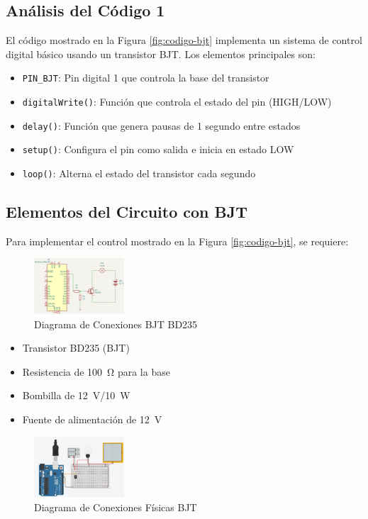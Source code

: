 \subsection{Análisis del Código 1}
El código mostrado en la Figura \ref{fig:codigo-bjt} implementa un sistema de control digital básico usando un transistor BJT. Los elementos principales son:

\begin{itemize}
	\item \texttt{PIN\_BJT}: Pin digital 1 que controla la base del transistor
	\item \texttt{digitalWrite()}: Función que controla el estado del pin (HIGH/LOW)
	\item \texttt{delay()}: Función que genera pausas de 1 segundo entre estados
	\item \texttt{setup()}: Configura el pin como salida e inicia en estado LOW
	\item \texttt{loop()}: Alterna el estado del transistor cada segundo
\end{itemize}

\subsection{Elementos del Circuito con BJT}
Para implementar el control mostrado en la Figura \ref{fig:codigo-bjt}, se requiere:
\begin{figure}[H]
	\centering
	\includegraphics[width=0.3\textwidth]{images/esquematico1}
	\caption{Diagrama de Conexiones BJT BD235}
	\label{fig:diagramaBJT}
\end{figure}
\begin{itemize}
	\item Transistor BD235 (BJT)
	\item Resistencia de \SI{100}{\ohm} para la base
	\item Bombilla de \SI{12}{\volt}/\SI{10}{\watt}
	\item Fuente de alimentación de \SI{12}{\volt}
\end{itemize}

\begin{figure}[H]
	\centering
	\includegraphics[width=0.3\textwidth]{images/conexion1}
	\caption{Diagrama de Conexiones Físicas BJT}
	\label{fig:conexionbjt}
\end{figure}

